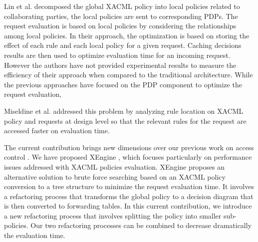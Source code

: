 Lin et al. \cite{decomposition} decomposed the global XACML policy into local policies related to collaborating parties, the local policies 
are sent to corresponding PDPs. The request evaluation is based on local policies by considering the relationships among local
 policies. In their approach, the optimization is based on storing the effect of each rule and each local policy for 
a given request. Caching decisions results are then used to optimize evaluation time for an incoming request. However the authors have 
not provided experimental results to measure the efficiency of their approach when compared to the traditional architecture.  
While the previous approaches have focused on the PDP component to optimize the request evaluation, 


Miseldine et al. \cite{XACMLstructure} addressed this problem by analyzing rule location on XACML policy and requests at design level so that the relevant rules for the request are accessed faster on evaluation time. 


The current contribution brings new dimensions over our previous work on access control \cite{Xengine, testcase, models}.
We have proposed XEngine \cite{Xengine}, which focuses particularly on performance issues addressed with XACML policies evaluation. XEngine proposes an 
alternative solution to brute force searching based on an XACML policy conversion to a tree structure to minimize the request evaluation time. 
It involves a refactoring process that transforms the global policy to a decision diagram that is then converted to 
forwarding tables. In this current contribution, we introduce a new refactoring process that involves splitting the policy into smaller sub-policies. Our 
two refactoring processes can be combined to  decrease dramatically the evaluation time. 
